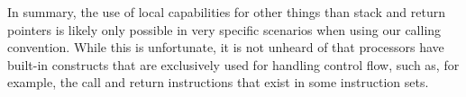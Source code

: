 \documentclass[format=acmsmall, review=false, screen=true]{acmart}
\begin{document}
In summary, the use of local capabilities for other things than stack and return
pointers is likely only possible in very specific scenarios when using our
calling convention. While this is unfortunate, it is not unheard of that
processors have built-in constructs that are exclusively used for handling
control flow, such as, for example, the call and return instructions that exist
in some instruction sets.
\end{document}
